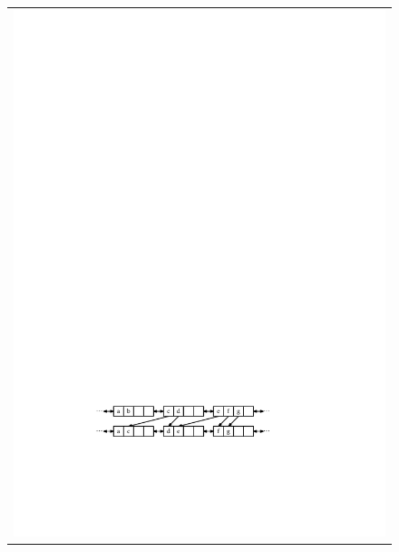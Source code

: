 \begin{figure}
	\noindent
	\begin{center}
		\begin{tabular}{l}
			\includegraphics[scale=0.90909]{figs/selist-remove-a}\\[4ex]

\end{tabular}
\end{center}
\end{figure}
